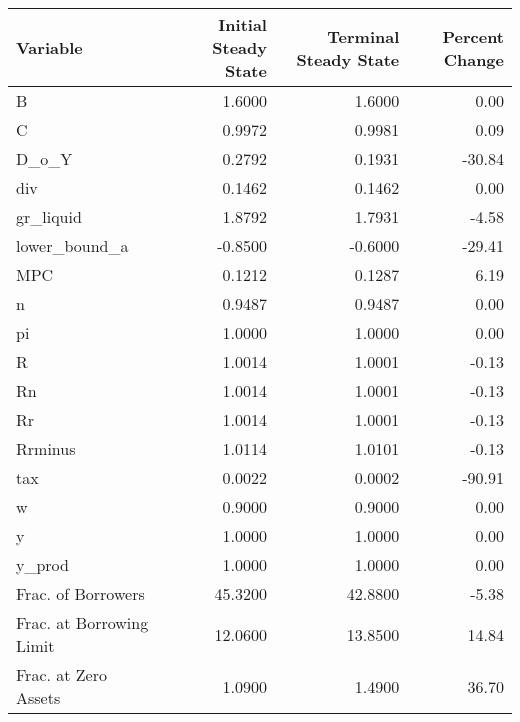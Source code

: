 \begin{table}
\centering
\label{tab:stst}
\begin{tabular}{lrrr}
\toprule
                Variable &  Initial Steady State &  Terminal Steady State &  Percent Change \\
\midrule
                       B &                1.6000 &                 1.6000 &            0.00 \\
                       C &                0.9972 &                 0.9981 &            0.09 \\
                   D\_o\_Y &                0.2792 &                 0.1931 &          -30.84 \\
                     div &                0.1462 &                 0.1462 &            0.00 \\
               gr\_liquid &                1.8792 &                 1.7931 &           -4.58 \\
           lower\_bound\_a &               -0.8500 &                -0.6000 &          -29.41 \\
                     MPC &                0.1212 &                 0.1287 &            6.19 \\
                       n &                0.9487 &                 0.9487 &            0.00 \\
                      pi &                1.0000 &                 1.0000 &            0.00 \\
                       R &                1.0014 &                 1.0001 &           -0.13 \\
                      Rn &                1.0014 &                 1.0001 &           -0.13 \\
                      Rr &                1.0014 &                 1.0001 &           -0.13 \\
                 Rrminus &                1.0114 &                 1.0101 &           -0.13 \\
                     tax &                0.0022 &                 0.0002 &          -90.91 \\
                       w &                0.9000 &                 0.9000 &            0.00 \\
                       y &                1.0000 &                 1.0000 &            0.00 \\
                  y\_prod &                1.0000 &                 1.0000 &            0.00 \\
      Frac. of Borrowers &               45.3200 &                42.8800 &           -5.38 \\
Frac. at Borrowing Limit &               12.0600 &                13.8500 &           14.84 \\
    Frac. at Zero Assets &                1.0900 &                 1.4900 &           36.70 \\
\bottomrule
\end{tabular}
\end{table}
